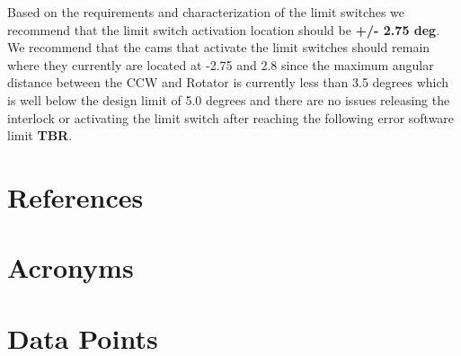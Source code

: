 \documentclass[SE,authoryear,toc, lsstdraft]{lsstdoc}
\begin{document}
Based on the requirements and characterization of the limit switches we
recommend that the limit switch activation location should be
\textbf{+/- 2.75 deg}. We recommend that the cams that activate the limit switches should remain where
they currently are located at -2.75 and 2.8 since the maximum angular distance between the CCW and
Rotator is currently less than 3.5 degrees which is well below the design limit of 5.0 degrees and
there are no issues releasing the interlock or activating the limit switch after reaching the
following error software limit \textbf{TBR}.

\appendix
\section{References} \label{sec:bib}
\renewcommand{\refname}{} %


\section{Acronyms} \label{sec:acronyms}


\section{Data Points} \label{sec:data}
\end{document}
